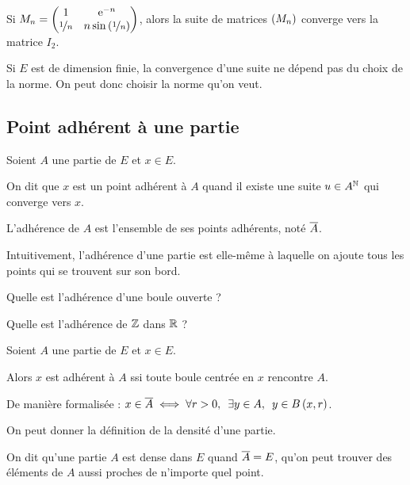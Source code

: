\begin{ex}~\\
Si \(M_n=\begin{pmatrix}
1 & \mathrm{e}^{-n} \\
\nicefrac{1}{n} & n\sin\left(\nicefrac{1}{n}\right)
\end{pmatrix}\), alors la suite de matrices \(\left(M_n\right)\) converge vers la matrice \(I_2\).
\end{ex}

\begin{cor}
Si \(E\) est de dimension finie, la convergence d'une suite ne dépend pas du choix de la norme. On peut donc choisir la norme qu'on veut.
\end{cor}

\subsection{Point adhérent à une partie}

\begin{defi}
Soient \(A\) une partie de \(E\) et \(x\in E\).

On dit que \(x\) est un point adhérent à \(A\) quand il existe une suite \(u\in A^{\mathbb{N}}\) qui converge vers \(x\).

L'adhérence de \(A\) est l'ensemble de ses points adhérents, noté \(\overline{A}\).
\end{defi}

Intuitivement, l'adhérence d'une partie est elle-même à laquelle on ajoute tous les points qui se trouvent sur son bord.

\begin{exo}
Quelle est l'adhérence d'une boule ouverte ?
\end{exo}

\begin{exo}
Quelle est l'adhérence de \(\mathbb{Z}\) dans \(\mathbb{R}\) ?
\end{exo}

\begin{prop}
Soient \(A\) une partie de \(E\) et \(x\in E\).

Alors \(x\) est adhérent à \(A\) ssi toute boule centrée en \(x\) rencontre \(A\).

De manière formalisée : \(x\in\conj{A}\ssi\quantifs{\forall r>0;\exists y\in A}y\in\bouleo{x}{r}\).
\end{prop}

On peut donner la définition de la densité d'une partie.

\begin{defi}
On dit qu'une partie \(A\) est dense dans \(E\) quand \(\overline{A}=E\), \cad qu'on peut trouver des éléments de \(A\) aussi proches de n'importe quel point.
\end{defi}

